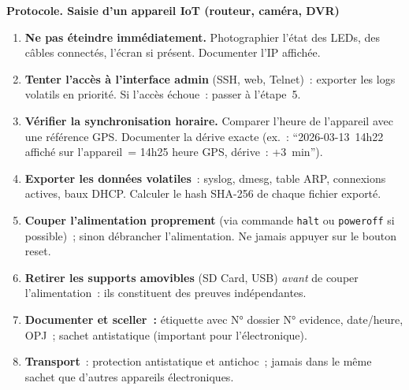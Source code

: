 \begin{boxPNC}
\textbf{Protocole. Saisie d'un appareil IoT (routeur, caméra, DVR)}

\begin{enumerate}
    \item \textbf{Ne pas éteindre immédiatement.}
          Photographier l'état des LEDs, des câbles connectés,
          l'écran si présent. Documenter l'IP affichée.
    \item \textbf{Tenter l'accès à l'interface admin} (SSH, web,
          Telnet)~: exporter les logs volatils en priorité.
          Si l'accès échoue~: passer à l'étape~5.
    \item \textbf{Vérifier la synchronisation horaire.}
          Comparer l'heure de l'appareil avec une référence GPS.
          Documenter la dérive exacte (ex.~: ``2026-03-13~14h22
          affiché sur l'appareil~= 14h25 heure GPS, dérive~: +3~min'').
    \item \textbf{Exporter les données volatiles}~: syslog, dmesg,
          table ARP, connexions actives, baux DHCP. Calculer le hash
          SHA-256 de chaque fichier exporté.
    \item \textbf{Couper l'alimentation proprement} (via commande
          \texttt{halt} ou \texttt{poweroff} si possible)~; sinon
          débrancher l'alimentation. Ne jamais appuyer sur le
          bouton reset.
    \item \textbf{Retirer les supports amovibles} (SD Card, USB)
          \emph{avant} de couper l'alimentation~: ils constituent
          des preuves indépendantes.
    \item \textbf{Documenter et sceller~:} étiquette avec N° dossier
          N° evidence, date/heure, OPJ~; sachet antistatique
          (important pour l'électronique).
    \item \textbf{Transport}~: protection antistatique et
          antichoc~; jamais dans le même sachet que d'autres
          appareils électroniques.
\end{enumerate}
\end{boxPNC}

\separateur


